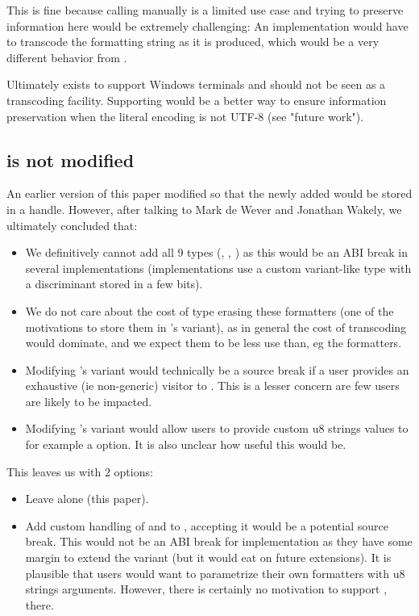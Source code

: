 \documentclass{wg21}
\begin{document}
This is fine because calling  manually is a limited use case and trying to preserve information here would be extremely challenging:
An implementation would have to transcode the formatting string as it is produced, which would be a very different behavior from .

Ultimately  exists to support Windows terminals and should not be seen as a transcoding facility.
Supporting   would be a better way to ensure information preservation when the literal encoding is not UTF-8
(see "future work").

\subsection{ is not modified}

An earlier version of this paper modified  so that the newly added  would be stored in a handle.
However, after talking to Mark de Wever and Jonathan Wakely, we ultimately concluded that:

\begin{itemize}
\item We definitively cannot add all 9 types (, , ) as this would be an ABI break in several implementations
(implementations use a custom variant-like type with a discriminant stored in a few bits).
\item We do not care about the cost of type erasing these formatters (one of the motivations to store them in 's variant), as in general the cost of transcoding would dominate, and we expect them to be less use than, eg the  formatters.
\item Modifying 's variant would technically be a source break if a user provides an exhaustive (ie non-generic) visitor to . This is a lesser concern are few users are likely to be impacted.
\item Modifying 's variant would allow users to provide custom u8 strings values to for example a  option. It is also unclear how useful this would be.
\end{itemize}

This leaves us with 2 options:
\begin{itemize}
\item Leave  alone (this paper).
\item Add custom handling of  and  to , accepting it would be a potential source break.
This would not be an ABI break for implementation as they have some margin to extend the variant (but it would eat on future extensions).
It is plausible that users would want to parametrize their own formatters with u8 strings arguments. However, there is certainly no motivation to support
,  there.
\end{itemize}
\end{document}
